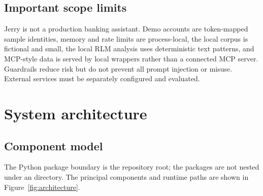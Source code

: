 \documentclass[11pt,a4paper,oneside]{report}
\newcommand{\code}[1]{\texttt{\detokenize{#1}}}
\begin{document}
\section{Important scope limits}
Jerry is not a production banking assistant. Demo accounts are token-mapped sample identities, memory and rate limits are process-local, the local corpus is fictional and small, the local RLM analysis uses deterministic text patterns, and MCP-style data is served by local wrappers rather than a connected MCP server. Guardrails reduce risk but do not prevent all prompt injection or misuse. External services must be separately configured and evaluated.

\chapter{System architecture}

\section{Component model}
The Python package boundary is the repository root; the packages are not nested under an \code{app/} directory. The principal components and runtime paths are shown in Figure~\ref{fig:architecture}.
\end{document}
